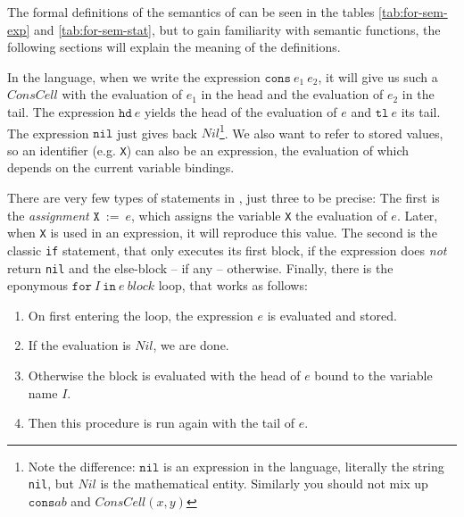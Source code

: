 The formal definitions of the semantics of \FOR can be seen in the tables 
\ref{tab:for-sem-exp} and \ref{tab:for-sem-stat}, but to gain familiarity 
with semantic functions, the following sections will explain the meaning of 
the definitions.

In the \FOR language, when we write the expression $\mathtt{cons}\: e_1\: e_2$, it
will give us such a $ConsCell$ with the evaluation of $e_1$ in the head and the
evaluation of $e_2$ in the tail. The expression $\mathtt{hd}\: e$ yields the head of
the evaluation of $e$ and $\mathtt{tl}\: e$ its tail. The expression 
$\mathtt{nil}$ just gives back $Nil$\footnote{
	Note the difference: $\mathtt{nil}$ is an expression in the language,
	literally the string {\tt nil}, but $Nil $ is the mathematical entity.
	Similarly you should not mix up $\mathtt{cons} a b$ and $ConsCell(x, y)$}.
We also want to refer to stored values, so an identifier (e.g. {\tt X}) can
also be an expression, the evaluation of which depends on the current variable
bindings.

There are very few types of statements in \FOR, just three to be precise: The 
first is the {\em assignment} $\mathtt{X}\:\mathtt{:=}\: e$, which assigns the variable {\tt X}
the evaluation of $e$. Later, when {\tt X} is used in an expression, it 
will reproduce this value. The second is the classic {\tt if} statement, that 
only executes its first block, if the expression does {\em not} return {\tt nil} 
and the else-block -- if any -- otherwise. Finally, there is the eponymous 
$\mathtt{for}\: I\: \mathtt{in}\: e\: block$ loop, that works as follows:

\begin{enumerate}
	\item On first entering the loop, the expression $e$ is evaluated and stored.
	\item If the evaluation is $Nil$, we are done.
	\item Otherwise the block is evaluated with the head of $e$ bound to the 
		variable name $I$.
	\item Then this procedure is run again with the tail of $e$.
\end{enumerate}

